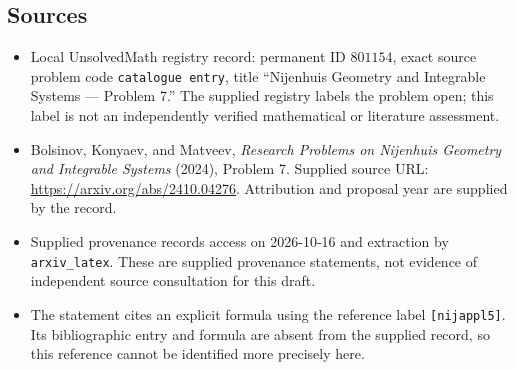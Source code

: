\documentclass[11pt]{article}
\begin{document}
\subsection{Sources}
\begin{itemize}
\item Local UnsolvedMath registry record: permanent ID \(801154\), exact source problem code \texttt{catalogue entry}, title ``Nijenhuis Geometry and Integrable Systems --- Problem 7.'' The supplied registry labels the problem open; this label is not an independently verified mathematical or literature assessment.
\item Bolsinov, Konyaev, and Matveev, \emph{Research Problems on Nijenhuis Geometry and Integrable Systems} (2024), Problem 7. Supplied source URL: \url{https://arxiv.org/abs/2410.04276}. Attribution and proposal year are supplied by the record.
\item Supplied provenance records access on 2026-10-16 and extraction by \texttt{arxiv\_latex}. These are supplied provenance statements, not evidence of independent source consultation for this draft.
\item The statement cites an explicit formula using the reference label \texttt{[nijappl5]}. Its bibliographic entry and formula are absent from the supplied record, so this reference cannot be identified more precisely here.
\end{itemize}
\end{document}
